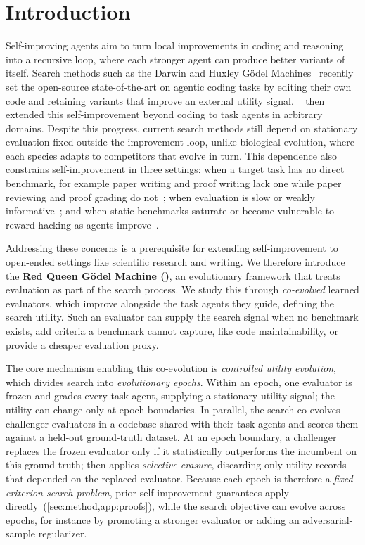 \section{Introduction}
\label{sec:intro}


Self-improving agents aim to turn local improvements in coding and reasoning into a recursive loop, where each stronger agent can produce better variants of itself. Search methods such as the Darwin and Huxley G\"odel Machines~\citep{zhang2025darwin,wang2025huxley} recently set the open-source state-of-the-art on agentic coding tasks by editing their own code and retaining variants that improve an external utility signal. \hyperagents~\citep{zhang2026hyperagents} then extended this self-improvement beyond coding to task agents in arbitrary domains. Despite this progress, current search methods still depend on stationary evaluation fixed outside the improvement loop, unlike biological evolution, where each species adapts to competitors that evolve in turn. This dependence also constrains self-improvement in three settings: when a target task has no direct benchmark, for example paper writing and proof writing lack one while paper reviewing and proof grading do not~\citep{DBLP:journals/corr/abs-2408-06292,yamada2025ai,luong2025towards}; when evaluation is slow or weakly informative~\citep{levine2018learning,burger2020mobile,NIPS2017_453fadbd}; and when static benchmarks saturate or become vulnerable to reward hacking as agents improve~\citep{DBLP:journals/corr/abs-2603-25681,DBLP:journals/corr/abs-2203-04592}.

Addressing these concerns is a prerequisite for extending self-improvement to open-ended settings like scientific research and writing. We therefore introduce the \textbf{Red Queen G\"odel Machine (\ourmethod)}, an evolutionary framework that treats evaluation as part of the search process. We study this through \emph{co-evolved} learned evaluators, which improve alongside the task agents they guide, defining the search utility. Such an evaluator can supply the search signal when no benchmark exists, add criteria a benchmark cannot capture, like code maintainability, or provide a cheaper evaluation proxy.

The core mechanism enabling this co-evolution is \emph{controlled utility evolution}, which divides search into \emph{evolutionary epochs}. Within an epoch, one evaluator is frozen and grades every task agent, supplying a stationary utility signal; the utility can change only at epoch boundaries. In parallel, the search co-evolves challenger evaluators in a codebase shared with their task agents and scores them against a held-out ground-truth dataset.  At an epoch boundary, a challenger replaces the frozen evaluator only if it statistically outperforms the incumbent on this ground truth; \theourmethod then applies \emph{selective erasure}, discarding only utility records that depended on the replaced evaluator. Because each epoch is therefore a \emph{fixed-criterion search problem}, prior self-improvement guarantees apply directly~(\cref{sec:method,app:proofs}), while the search objective can evolve across epochs, for instance by promoting a stronger evaluator or adding an adversarial-sample regularizer.


